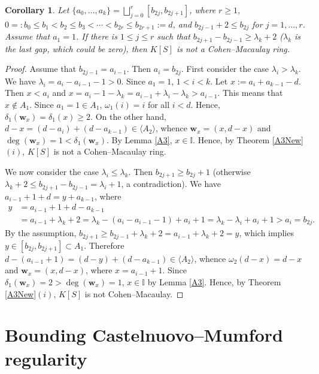 \documentclass[11pt]{article}
\newtheorem{Corollary}[Theorem]{Corollary}
\def\deg{\operatorname{deg}}
\def\wbf{{\mathbf w}}
\def\Iset{{\mathbb I}}
\theoremstyle{remark}
\theoremstyle{definition}
\begin{document}
\begin{Corollary} \label{A3b} Let  $\{a_0,\ldots,a_k\} = \bigsqcup_{j=0}^r [b_{2j},b_{2j+1}]$, where $r\geq 1$,  $0=:b_0 \leq b_1 < b_2 \leq b_3 < \cdots < b_{2r}\leq b_{2r+1} := d$, and $b_{2j-1} + 2 \leq b_{2j}$ for $j=1,\ldots,r$.  Assume that $a_1=1$.  If there is $1\leq j\leq r$ such that  $b_{2j+1} - b_{2j-1}\geq \lambda_k + 2$ ($\lambda_k$ is the last gap, which could be zero), then $K[S]$ is not a Cohen--Macaulay ring.
\end{Corollary}

\begin{proof} Assume that $b_{2j-1} = a_{i-1}$. Then  $a_i = b_{2j}$. First consider the case $\lambda_i > \lambda_k$. We have $\lambda_i = a_i - a_{i-1} - 1 > 0$. Since $a_1 =1$, $1 < i < k$. Let $x := a_i + a_{k-1} - d$. Then  $x< a_i$ and $x= a_i - 1 - \lambda_k = a_{i-1} + \lambda_i - \lambda_k > a_{i-1}$. This means that $x\not\in A_1$. Since $a_1 = 1 \in A_1$, $\omega_1(i) =i$ for all $i< d$. Hence, $\delta_1(\wbf_x) = \delta_1(x) \geq 2$. On the other hand, $ d-x = (d-a_i) + (d-a_{k-1}) \in \langle A_2 \rangle$, whence $\wbf_x = (x, d-x)$ and $\deg(\wbf_x) = 1 <   \delta_1(\wbf_x) $. By Lemma \ref{A3}, $x\in \Iset$. Hence, by Theorem \ref{A3New}\((i)\), $K[S]$ is not a Cohen--Macaulay ring.

We now consider the case $\lambda_i \leq \lambda_k$. Then $b_{2j+1} \geq b_{2j} + 1$ (otherwise $\lambda_k+2 \leq b_{2j+1} - b_{2j-1} = \lambda_i +1$, a contradiction). We have $a_{i-1} + 1 +  d= y + a_{k-1}$, where 
\begin{align*}
    y & = a_{i-1} +1 +  d- a_{k-1} \\
& = a_{i-1} + \lambda_k +2  = \lambda_k - (a_i - a_{i-1} -1) + a_i +1  = \lambda_k - \lambda_i + a_i  +1 > a_i  = b_{2j}.
\end{align*}
 By the assumption,  $b_{2j+1} \geq b_{2j-1} + \lambda_k + 2 = a_{i-1} + \lambda_k + 2 = y$, which implies  $y \in [b_{2j}, b_{2j+1}] \subset A_1$. Therefore $d- (a_{i-1} + 1) = (d-y) + (d- a_{k-1}) \in \langle A_2 \rangle$, whence $\omega_2(d-x) = d-x$ and $\wbf_x = (x, d-x)$, where $x= a_{i-1} + 1$.  Since $\delta_1(\wbf_x) = 2 > \deg(\wbf_x) = 1$, $x\in \Iset$ by Lemma \ref{A3}. Hence, by Theorem \ref{A3New}\((i)\),  $K[S]$ is not Cohen--Macaulay.
\end{proof}

\section{Bounding Castelnuovo--Mumford regularity} \label{Breg}
\end{document}
